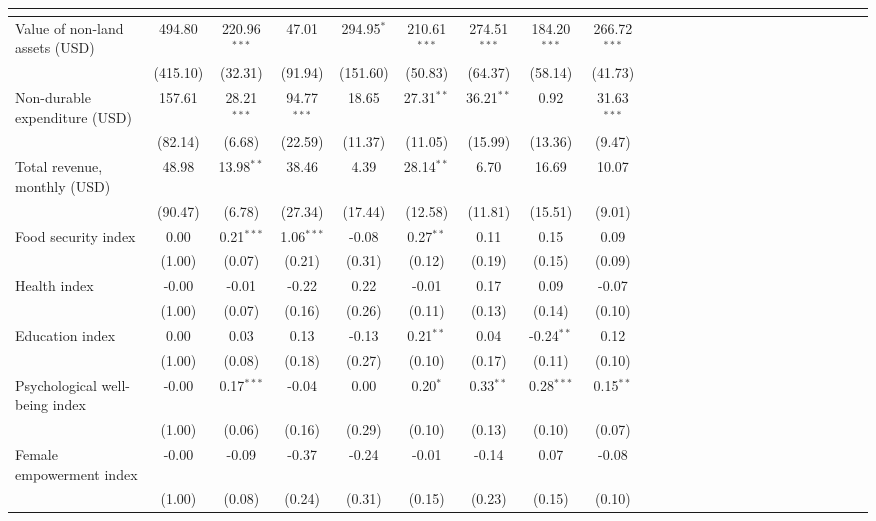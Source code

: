 {
\def\sym#1{\ifmmode^{#1}\else\(^{#1}\)\fi}
\begin{tabular}{l*{8}{SSS}}
\toprule
          &&&&&&&&\\
\midrule
Value of non-land assets (USD)&   494.80&220.96$^{***}$&    47.01&294.95$^{*}$&210.61$^{***}$&274.51$^{***}$&184.20$^{***}$&266.72$^{***}$\\
          & (415.10)&  (32.31)&  (91.94)& (151.60)&  (50.83)&  (64.37)&  (58.14)&  (41.73)\\
Non-durable expenditure (USD)&   157.61&28.21$^{***}$&94.77$^{***}$&    18.65&27.31$^{**}$&36.21$^{**}$&     0.92&31.63$^{***}$\\
          &  (82.14)&   (6.68)&  (22.59)&  (11.37)&  (11.05)&  (15.99)&  (13.36)&   (9.47)\\
Total revenue, monthly (USD)&    48.98&13.98$^{**}$&    38.46&     4.39&28.14$^{**}$&     6.70&    16.69&    10.07\\
          &  (90.47)&   (6.78)&  (27.34)&  (17.44)&  (12.58)&  (11.81)&  (15.51)&   (9.01)\\
Food security index&     0.00&0.21$^{***}$&1.06$^{***}$&    -0.08&0.27$^{**}$&     0.11&     0.15&     0.09\\
          &   (1.00)&   (0.07)&   (0.21)&   (0.31)&   (0.12)&   (0.19)&   (0.15)&   (0.09)\\
Health index&    -0.00&    -0.01&    -0.22&     0.22&    -0.01&     0.17&     0.09&    -0.07\\
          &   (1.00)&   (0.07)&   (0.16)&   (0.26)&   (0.11)&   (0.13)&   (0.14)&   (0.10)\\
Education index&     0.00&     0.03&     0.13&    -0.13&0.21$^{**}$&     0.04&-0.24$^{**}$&     0.12\\
          &   (1.00)&   (0.08)&   (0.18)&   (0.27)&   (0.10)&   (0.17)&   (0.11)&   (0.10)\\
Psychological well-being index&    -0.00&0.17$^{***}$&    -0.04&     0.00&0.20$^{*}$&0.33$^{**}$&0.28$^{***}$&0.15$^{**}$\\
          &   (1.00)&   (0.06)&   (0.16)&   (0.29)&   (0.10)&   (0.13)&   (0.10)&   (0.07)\\
Female empowerment index&    -0.00&    -0.09&    -0.37&    -0.24&    -0.01&    -0.14&     0.07&    -0.08\\
          &   (1.00)&   (0.08)&   (0.24)&   (0.31)&   (0.15)&   (0.23)&   (0.15)&   (0.10)\\
\bottomrule
\end{tabular}
}
